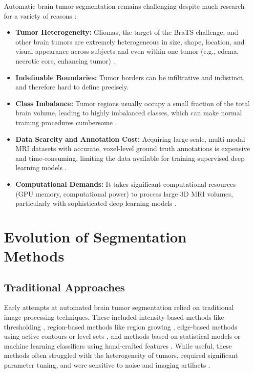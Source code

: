 Automatic brain tumor segmentation remains challenging despite much research for a variety of reasons \parencite{gordillo2013state, litjens2017survey}:
\begin{itemize}
  \item \textbf{Tumor Heterogeneity:} Gliomas, the target of the BraTS challenge, and other brain tumors are extremely heterogeneous in size, shape, location, and visual appearance across subjects and even within one tumor (e.g., edema, necrotic core, enhancing tumor) \parencite{bakas2018identifying, ranjbarzadeh2021brain}.
  \item \textbf{Indefinable Boundaries:} Tumor borders can be infiltrative and indistinct, and therefore hard to define precisely.
  \item \textbf{Class Imbalance:} Tumor regions usually occupy a small fraction of the total brain volume, leading to highly imbalanced classes, which can make normal training procedures cumbersome \parencite{isensee2018brain, havaei2017brain}.
  \item \textbf{Data Scarcity and Annotation Cost:} Acquiring large-scale, multi-modal MRI datasets with accurate, voxel-level ground truth annotations is expensive and time-consuming, limiting the data available for training supervised deep learning models \parencite{ullah2023enhancing}.
  \item \textbf{Computational Demands:} It takes significant computational resources (GPU memory, computational power) to process large 3D MRI volumes, particularly with sophisticated deep learning models \parencite{havaei2017brain}.
\end{itemize}

\section{Evolution of Segmentation Methods}

\subsection{Traditional Approaches}
Early attempts at automated brain tumor segmentation relied on traditional image processing techniques. These included intensity-based methods like thresholding \parencite{gordillo2013state}, region-based methods like region growing \parencite{melouah2018overview}, edge-based methods using active contours or level sets \parencite{caselles1997geodesic, pierre2021segmentation}, and methods based on statistical models or machine learning classifiers using hand-crafted features \parencite{gordillo2013state}. While useful, these methods often struggled with the heterogeneity of tumors, required significant parameter tuning, and were sensitive to noise and imaging artifacts \parencite{cai2018quantitative}.


